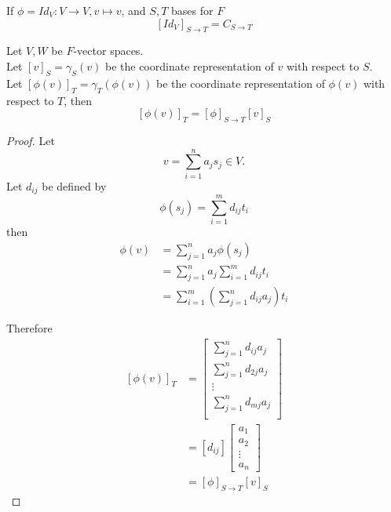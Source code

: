 \begin{remark}          
    If $\phi = Id_{V}: V \to V, v \mapsto v$, and $S, T$ bases for $F$
    \[
        [Id_V]_{S \to T} = C_{S \to T}
    \]
\end{remark}            

\begin{proposition}
    Let $V, W$ be $F$-vector spaces.  \\

    Let $[v]_S = \gamma_S (v)$ be the coordinate representation of $v$ with respect to $S$. \\
    Let $[\phi(v)]_T = \gamma_T (\phi(v))$ be the coordinate representation of $\phi(v)$ with respect to $T$, then 
    \[
        \left[ \phi(v) \right]_T = \left[ \phi \right]_{S \to T} \left[ v \right]_S
    \]
\end{proposition}
\begin{proof}
    Let 
    \[
        v = \sum\limits_{i = 1}^{n} a_j s_j \in V.
    \]
    Let $d_{ij}$ be defined by 
    \[
        \phi(s_j) = \sum\limits_{i = 1}^{m} d_{ij}t_i
    \]
    then
    \begin{align*}
        \phi(v) &= \sum\limits_{j = 1}^{n}  a_j \phi(s_j) \\
        &= \sum\limits_{j = 1}^{n}  a_j \sum\limits_{i = 1}^{m} d_{ij} t_i \\
        &= \sum\limits_{i = 1}^{m} \left(  \sum\limits_{ j = 1}^{n} d_{ij}a_j \right)  t_i
    \end{align*}

    Therefore 
    \begin{align*}
        \left[  \phi(v)\right]_T &= \begin{bmatrix}
            \sum\limits_{j = 1}^{n} d_{ij}a_j \\
            \sum\limits_{j = 1}^{n} d_{2j}a_j \\
            \vdots \\
            \sum\limits_{j = 1}^{n} d_{mj}a_j \\
        \end{bmatrix} \\
        &= \left[ d_{ij} \right] \begin{bmatrix} 
            a_1 \\ a_2 \\ \vdots \\ a_n
        \end{bmatrix} \\ 
        &= \left[ \phi \right]_{S \to T} \left[ v \right]_S
    \end{align*}
\end{proof}

